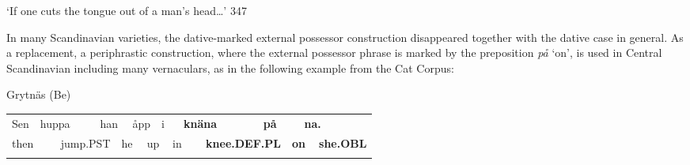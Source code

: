 \begin{styleTranslation}
‘If one cuts the tongue out of a man’s head…’ 347

\end{styleTranslation}

\begin{styleBodyTextFirst}
In many Scandinavian varieties, the dative-marked external possessor construction disappeared together with the dative case in general. As a replacement, a periphrastic construction, where the external possessor phrase is marked by the preposition \textit{på} ‘on’, is used in Central Scandinavian including many vernaculars, as in the following example from the Cat Corpus: 

\end{styleBodyTextFirst}

\begin{listWWNumileveli}
\item {}

\begin{styleExample}
Grytnäs (Be) 

\end{styleExample}

\end{listWWNumileveli}

\begin{tabular}{llllllllllllllll}
\lsptoprule
Sen & \multicolumn{2}{l}{huppa

} & \multicolumn{2}{l}{han

} & \multicolumn{2}{l}{åpp

} & \multicolumn{2}{l}{i

} & \multicolumn{2}{l}{{\bfseries knäna}

} & \multicolumn{2}{l}{{\bfseries på}

} & \multicolumn{2}{l}{{\bfseries na.}

} & \\
\multicolumn{2}{l}{then

} & \multicolumn{2}{l}{jump.PST

} & \multicolumn{2}{l}{he

} & \multicolumn{2}{l}{up

} & \multicolumn{2}{l}{in

} & \multicolumn{2}{l}{{\bfseries knee.DEF.PL}

} & \multicolumn{2}{l}{{\bfseries on}

} & \multicolumn{2}{l}{{\bfseries she.OBL}

}\\
\lspbottomrule
\end{tabular}

